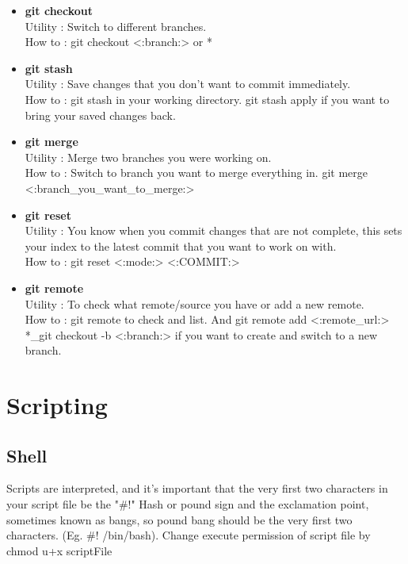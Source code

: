 \begin{itemize}
    \item \textbf{git checkout} \\ Utility : Switch to different branches. \\ How to : git checkout <:branch:> or * 
    \item \textbf{git stash} \\ Utility : Save changes that you don't want to commit immediately. \\ How to : git stash in your working directory. git stash apply if you want to bring your saved changes back.
    \item \textbf{git merge} \\ Utility : Merge two branches you were working on. \\ How to : Switch to branch you want to merge everything in. git merge <:branch\_you\_want\_to\_merge:>
    \item \textbf{git reset} \\ Utility : You know when you commit changes that are not complete, this sets your index to the latest commit that you want to work on with. \\ How to : git reset <:mode:> <:COMMIT:>
    \item \textbf{git remote} \\ Utility : To check what remote/source you have or add a new remote. \\ How to : git remote to check and list. And git remote add <:remote\_url:>		*\_git checkout -b <:branch:> if you want to create and switch to a new branch.
\end{itemize}





\section{Scripting}
\subsection{Shell}
Scripts are interpreted, and it's important that the very first two characters in your script file be the "\#!" Hash or pound sign and the exclamation point, sometimes known as bangs, so pound bang should be the very first two characters. (Eg. \#! /bin/bash). Change execute permission of script file by chmod u+x scriptFile

